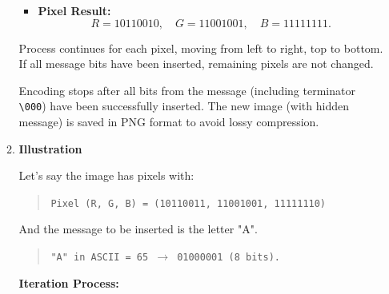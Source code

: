 \documentclass{ittelkom}
\begin{document}
\begin{enumerate}
\begin{enumerate}
\begin{itemize}
                        \item \textbf{Pixel Result:}
                              \[
                                  R = 10110010, \quad G = 11001001, \quad B = 11111111.
                              \]
                    \end{itemize}

                    Process continues for each pixel, moving from left to right, top to bottom. If
                    all message bits have been inserted, remaining pixels are not changed.

                    Encoding stops after all bits from the message (including terminator
                    \texttt{\textbackslash 000}) have been successfully inserted. The new image
                    (with hidden message) is saved in PNG format to avoid lossy compression.
              \item \textbf{Illustration}

                    Let's say the image has pixels with:

                    \begin{quote}
                        \texttt{Pixel (R, G, B) = (10110011, 11001001, 11111110)}
                    \end{quote}

                    And the message to be inserted is the letter "A".

                    \begin{quote}
                        \texttt{"A" in ASCII = 65 $\rightarrow$ 01000001 (8 bits).}
                    \end{quote}

                    \textbf{Iteration Process:}


\end{enumerate}
\end{enumerate}
\end{document}
